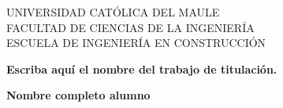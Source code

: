 

	\newcommand{\titulo}	{Escriba aquí el nombre del trabajo de titulación}
	\newcommand{\alumnos}	{Nombre completo alumno  %
					 				}
	\newcommand{\profguia}	{Profesor guía: Nombre completo profesor guía}

	  	  \newcommand{\coguia} 	{Profesor Co-guía: Nombre completo profesor} 
			
	\newcommand{\mes} 	{Mes}  %
	\newcommand{\yeaR} 	{2016} %
				
				
				
				
				
				
				
				
				
				
				
				
				
				
				
				
				
				
				
				
				


\begin{center}
{\renewcommand{\baselinestretch}{1}
\LARGE{UNIVERSIDAD CATÓLICA DEL MAULE}\\\Large{FACULTAD DE CIENCIAS DE LA INGENIERÍA\\ESCUELA DE INGENIERÍA EN CONSTRUCCIÓN}

}
\vspace{65mm}

\Large{\textbf{\titulo.}} 

\vspace{55mm}
\Large{\textbf{\alumnos}}

\vspace{30mm}

\end{center}
\vspace{10mm}

